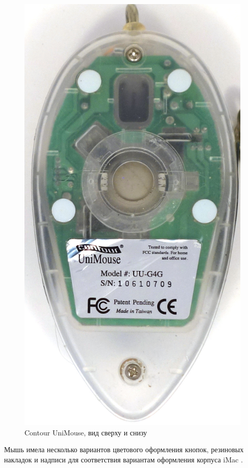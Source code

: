 \documentclass[11pt, a4paper]{article}
\begin{document}
\begin{figure}[h]
    \includegraphics[scale=0.45]{1999_contour_unimouse/bottom_30.jpg}
    \caption{Contour UniMouse, вид сверху и снизу}
    \label{fig:ContourUniMouseTopAndBottom}
\end{figure}

Мышь имела несколько вариантов цветового оформления кнопок, резиновых накладок и надписи для соответствия вариантам оформления корпуса iMac \cite{web}.
\end{document}

